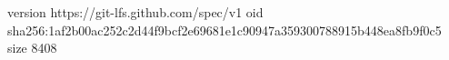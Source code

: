 version https://git-lfs.github.com/spec/v1
oid sha256:1af2b00ac252c2d44f9bcf2e69681e1c90947a359300788915b448ea8fb9f0c5
size 8408
